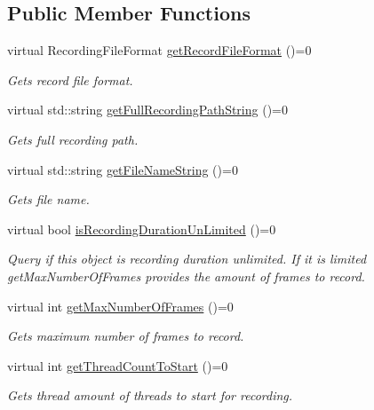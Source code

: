 \subsection*{Public Member Functions}
\begin{DoxyCompactItemize}
\item 
virtual Recording\+File\+Format \hyperlink{class_i_recording_configuration_aae376a55c4992f0223e877c28c3bfed9}{get\+Record\+File\+Format} ()=0
\begin{DoxyCompactList}\small\item\em Gets record file format. \end{DoxyCompactList}\item 
virtual std\+::string \hyperlink{class_i_recording_configuration_af5718b10c42674441d23b0b403367908}{get\+Full\+Recording\+Path\+String} ()=0
\begin{DoxyCompactList}\small\item\em Gets full recording path. \end{DoxyCompactList}\item 
virtual std\+::string \hyperlink{class_i_recording_configuration_a7f46e556537cc8628e63240889b93cc5}{get\+File\+Name\+String} ()=0
\begin{DoxyCompactList}\small\item\em Gets file name. \end{DoxyCompactList}\item 
virtual bool \hyperlink{class_i_recording_configuration_a001a4ba0282d154f014c8e35f43e212a}{is\+Recording\+Duration\+Un\+Limited} ()=0
\begin{DoxyCompactList}\small\item\em Query if this object is recording duration unlimited. If it is limited get\+Max\+Number\+Of\+Frames provides the amount of frames to record. \end{DoxyCompactList}\item 
virtual int \hyperlink{class_i_recording_configuration_a2e2719dabf4824516e7d5919dfb5f189}{get\+Max\+Number\+Of\+Frames} ()=0
\begin{DoxyCompactList}\small\item\em Gets maximum number of frames to record. \end{DoxyCompactList}\item 
virtual int \hyperlink{class_i_recording_configuration_a8148f1b3dfb5cafb347337c913058204}{get\+Thread\+Count\+To\+Start} ()=0
\begin{DoxyCompactList}\small\item\em Gets thread amount of threads to start for recording. \end{DoxyCompactList}\end{DoxyCompactItemize}


